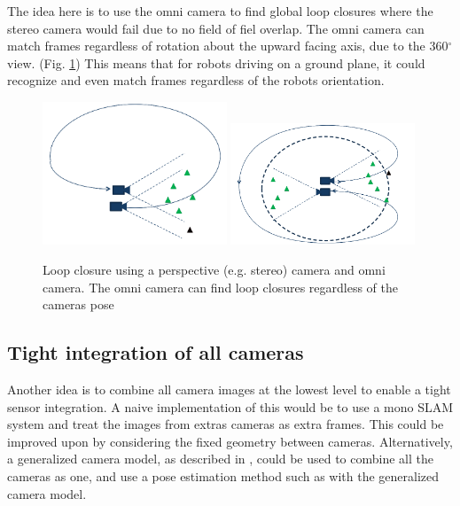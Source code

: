 The idea here is to use the omni camera to find global loop closures where the stereo camera would fail due to no field of fiel overlap.  The omni camera can match frames regardless of rotation about the upward facing axis, due to the 360$^{\circ}$ view.  (Fig. \ref{fig:omni_loop_close}) This means that for robots driving on a ground plane, it could recognize and even match frames regardless of the robots orientation.

\begin{figure}[h!]
  \centering
    \includegraphics[width=0.49\textwidth]{chapters/images/stereo_loop}
    \includegraphics[width=0.49\textwidth]{chapters/images/omni_loop} 
    \caption{Loop closure using a perspective (e.g. stereo) camera and omni camera.  The omni camera can find loop closures regardless of the cameras pose}
  \label{fig:omni_loop_close}
\end{figure}

\subsection{Tight integration of all cameras}

Another idea is to combine all camera images at the lowest level to enable a tight sensor integration.  A naive implementation of this would be to use a mono SLAM system and treat the images from extras cameras as extra frames.  This could be improved upon by considering the fixed geometry between cameras.  Alternatively, a generalized camera model, as described in \cite{pless_03}, could be used to combine all the cameras as one, and use a pose estimation method such as \cite{stewenius_05} with the generalized camera model.

